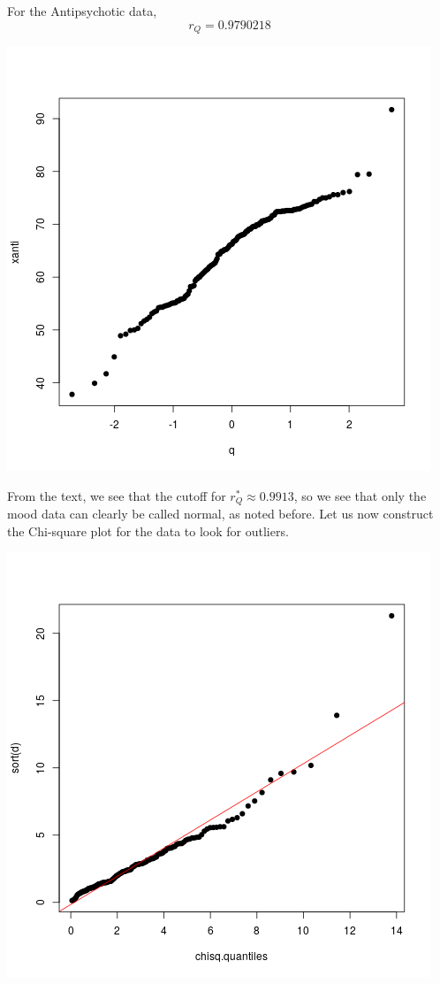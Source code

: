 \documentclass[letterpaper,10pt]{article}
\begin{document}
\begin{enumerate}
\begin{center}
\end{center}
For the Antipsychotic data,
\[r_Q=0.9790218\]
\begin{center}
\includegraphics[scale=.5]{antiq.png}
\end{center}
From the text, we see that the cutoff for $r_Q^*\approx 0.9913$, so we see that only the mood data can clearly be called normal, as noted before. Let us now construct the Chi-square plot for the data to look for outliers.
\begin{center}
\includegraphics[scale=.8]{originalchi.png}

\end{center}
\end{enumerate}
\end{document}
